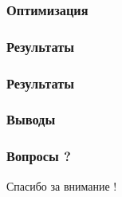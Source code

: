 \documentclass[utf8, 12pt]{beamer}
\begin{document}
\begin{frame}
\frametitle{Оптимизация}
\end{frame}

\begin{frame}
\frametitle{Результаты}
\end{frame}


\begin{frame}
\frametitle{Результаты}

\end{frame}

\begin{frame}
\frametitle{Выводы}
\end{frame}

\begin{frame}
\frametitle{Вопросы ?}
\begin{center}
{\huge Спасибо за внимание !}
\end{center}
\end{frame}
\end{document}
